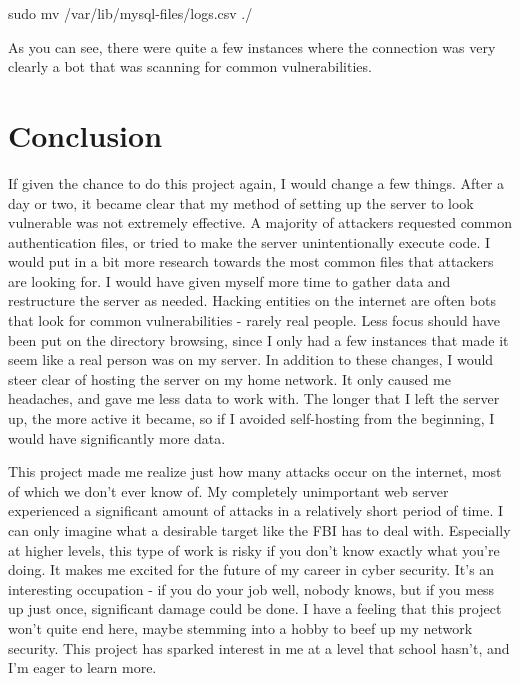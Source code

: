 \documentclass[12pt]{article}
\begin{document}
sudo mv /var/lib/mysql-files/logs.csv ./


As you can see, there were quite a few instances where the connection was very clearly a bot that was scanning for common vulnerabilities.


\section{Conclusion}
If given the chance to do this project again, I would change a few things.
After a day or two, it became clear that my method of setting up the server to look vulnerable was not extremely effective.
A majority of attackers requested common authentication files, or tried to make the server unintentionally execute code.
I would put in a bit more research towards the most common files that attackers are looking for.
I would have given myself more time to gather data and restructure the server as needed.
Hacking entities on the internet are often bots that look for common vulnerabilities - rarely real people.
Less focus should have been put on the directory browsing, since I only had a few instances that made it seem like a real person was on my server.
In addition to these changes, I would steer clear of hosting the server on my home network.
It only caused me headaches, and gave me less data to work with.
The longer that I left the server up, the more active it became, so if I avoided self-hosting from the beginning, I would have significantly more data.

This project made me realize just how many attacks occur on the internet, most of which we don't ever know of.
My completely unimportant web server experienced a significant amount of attacks in a relatively short period of time.
I can only imagine what a desirable target like the FBI has to deal with.
Especially at higher levels, this type of work is risky if you don't know exactly what you're doing.
It makes me excited for the future of my career in cyber security.
It's an interesting occupation - if you do your job well, nobody knows, but if you mess up just once, significant damage could be done.
I have a feeling that this project won't quite end here, maybe stemming into a hobby to beef up my network security.
This project has sparked interest in me at a level that school hasn't, and I'm eager to learn more.

\clearpage
\nocite{cohen_honeypot}
\printbibliography
\end{document}
